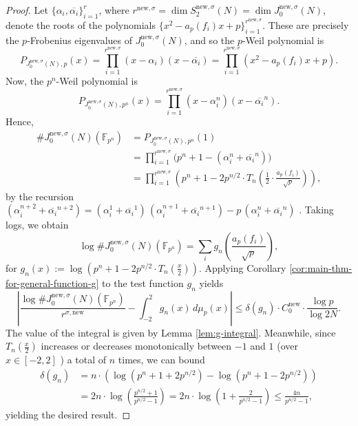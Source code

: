 \documentclass[11pt,letterpaper,reqno]{amsart}
\theoremstyle{definition}
\numberwithin{equation}{section}
\numberwithin{figure}{section}
\numberwithin{table}{section}
\newcommand{\nw}{\mathrm{new}}
\begin{document}
\begin{proof}
Let $\{\alpha_i,\overline{\alpha_i}\}_{i=1}^r$, where $r^{\nw, \sigma}= \dim S_2^{\nw, \sigma}(N) =\dim J_0^{\nw,\sigma}(N)$, denote the roots of the polynomials
$\{x^2-a_p(f_i)x+p\}_{i=1}^{r^{\nw, \sigma}}$. These are precisely the $p$-Frobenius eigenvalues of $J_0^{\nw,\sigma}(N)$, and so the $p$-Weil polynomial is 
$$
P_{J_0^{\nw,\sigma}(N),p}(x)
=
\prod_{i=1}^{r^{\nw, \sigma}} (x-\alpha_i)(x-\overline{\alpha_i})
=
\prod_{i=1}^{r^{\nw, \sigma}} (x^2-a_p(f_i)x+p).$$ Now, the $p^n$-Weil polynomial is
\[
P_{J_0^{\nw,\sigma}(N),p^n}(x)
=
\prod_{i=1}^{r^{\nw, \sigma}} (x-\alpha_i^n)(x-{\overline{\alpha_i}}^n).
\]
Hence,
\begin{align}
    \#J_0^{\nw,\sigma}(N)(\mathbb F_{p^n}) &= P_{J_0^{\nw,\sigma}(N),p^n}(1)\\
    &= \prod_{i=1}^{r^{\nw, \sigma}}
\bigl(p^n+1-(\alpha_i^n+\overline{\alpha_i}^n)\bigr)\\
&= \prod_{i=1}^{r^{\nw, \sigma}}
\left(p^n+1-  2p^{n/2}  \cdot T_n \left( \frac{1}{2} \cdot \frac{a_p(f_i)}{\sqrt{p}}  \right) \right),
\end{align}
by the recursion $(\alpha_i^{n+2} + \overline{\alpha_i}^{n+2}) =
(\alpha_i^{1} + \overline{\alpha_i}^{1})\,(\alpha_i^{n+1} + \overline{\alpha_i}^{n+1}) - p\,(\alpha_i^{n} + \overline{\alpha_i}^{n})$ . Taking logs, we obtain
\[
\log \#J_0^{\nw,\sigma}(N)(\mathbb F_{p^n})
=
\sum_i
g_n\!\left(\frac{a_p(f_i)}{\sqrt p}\right),
\]
for $g_n(x) := \log \left( p^n + 1 - 2p^{n/2} \cdot T_n \!\left(  \frac{x}{2} \right)  \right).$ Applying Corollary \ref{cor:main-thm-for-general-function-g} to the test function $g_n$ yields
\[
\left| \frac{\log \#J_0^{\nw,\sigma}(N)(\mathbb F_{p^n})}
     {r^{\sigma,\nw}}
- 
\int_{-2}^{2}
g_n(x)\,d\mu_p(x) \right| \leq \delta(g_n) \cdot C_0^{\nw} \cdot \frac{\log p}{\log 2N}.
\]
The value of the integral is given by Lemma \ref{lem:g-integral}. Meanwhile, since $T_n\!\left( \frac{x}{2} \right)$ increases or decreases monotonically between $-1$ and $1$  (over $ x \in [-2, 2]$ ) a total of $n$ times, we can bound
    \begin{align*}
        \delta(g_n) &= n \cdot \left( \log\left(p^n + 1 + 2p^{n/2} \right) - \log\left(p^n + 1 - 2p^{n/2}\right) \right) \\
        &= 2n \cdot \log\left(\frac{p^{n/2} + 1}{p^{n/2} - 1} \right) = 2n \cdot \log\left(1 + \frac{2}{p^{n/2} - 1} \right) \leq \frac{4n}{p^{n/2}-1},
    \end{align*}
yielding the desired result.
\end{proof}
\end{document}
